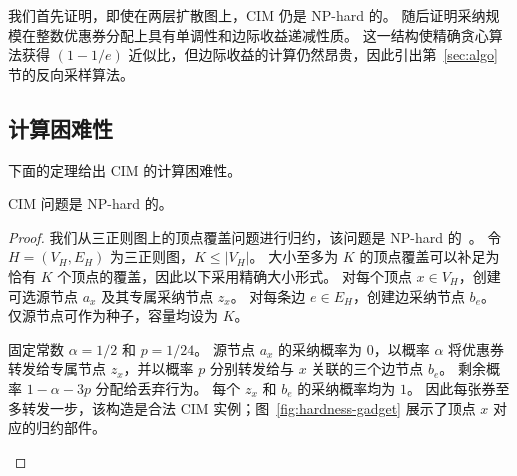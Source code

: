 \documentclass[sigconf,balance=false]{acmart}
\begin{document}
我们首先证明，即使在两层扩散图上，CIM 仍是 NP-hard 的。
随后证明采纳规模在整数优惠券分配上具有单调性和边际收益递减性质。
这一结构使精确贪心算法获得 $(1-1/e)$ 近似比，但边际收益的计算仍然昂贵，因此引出第~\ref{sec:algo} 节的反向采样算法。

\subsection{计算困难性}

下面的定理给出 CIM 的计算困难性。

\begin{theorem}
\label{thm:nphard}
CIM 问题是 NP-hard 的。
\end{theorem}

\begin{proof}
我们从三正则图上的顶点覆盖问题进行归约，该问题是 NP-hard 的~\cite{garey1976simplified}。
令 $H=(V_H,E_H)$ 为三正则图，$K\leq |V_H|$。
大小至多为 $K$ 的顶点覆盖可以补足为恰有 $K$ 个顶点的覆盖，因此以下采用精确大小形式。
对每个顶点 $x\in V_H$，创建可选源节点 $a_x$ 及其专属采纳节点 $z_x$。
对每条边 $e\in E_H$，创建边采纳节点 $b_e$。
仅源节点可作为种子，容量均设为 $K$。

固定常数 $\alpha=1/2$ 和 $p=1/24$。
源节点 $a_x$ 的采纳概率为 $0$，以概率 $\alpha$ 将优惠券转发给专属节点 $z_x$，并以概率 $p$ 分别转发给与 $x$ 关联的三个边节点 $b_e$。
剩余概率 $1-\alpha-3p$ 分配给丢弃行为。
每个 $z_x$ 和 $b_e$ 的采纳概率均为 $1$。
因此每张券至多转发一步，该构造是合法 CIM 实例；图~\ref{fig:hardness-gadget} 展示了顶点 $x$ 对应的归约部件。

\begin{figure}[t]
  \centering
\end{figure}
\end{proof}
\end{document}

